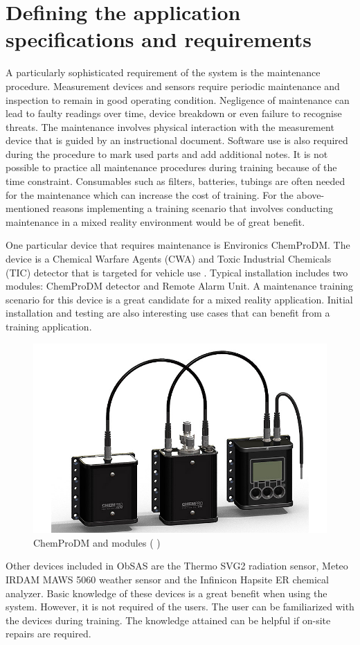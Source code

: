 \documentclass[12pt, a4paper,oneside, nocenter]{thesis}
\renewcommand{\citeyearpar}[1]{(\citeauthor{#1} \citeyear{#1})}
\begin{document}
\section{Defining the application specifications and requirements}
A particularly sophisticated requirement of the system is the maintenance procedure. Measurement devices and sensors require periodic maintenance and inspection to remain in good operating condition. Negligence of maintenance can lead to faulty readings over time, device breakdown or even failure to recognise threats. The maintenance involves physical interaction with the measurement device that is guided by an instructional document. Software use is also required during the procedure to mark used parts and add additional notes. It is not possible to practice all maintenance procedures during training because of the time constraint. Consumables such as filters, batteries, tubings are often needed for the maintenance which can increase the cost of training. For the above-mentioned reasons implementing a training scenario that involves conducting maintenance in a mixed reality environment would be of great benefit.
\par
One particular device that requires maintenance is Environics ChemProDM. The device is a Chemical Warfare Agents (CWA) and Toxic Industrial Chemicals (TIC) detector that is targeted for vehicle use . Typical installation includes two modules: ChemProDM detector and Remote Alarm Unit. A maintenance training scenario for this device is a great candidate for a mixed reality application. Initial installation and testing are also interesting use cases that can benefit from a training application.
\begin{figure}[H]
	\includegraphics[width=\textwidth]{chemprodm}
	\caption{ChemProDM and modules \citeyearpar{environics-chemprodm}}
	\label{fig:chemprodm}
\end{figure}
\par
Other devices included in ObSAS are the Thermo SVG2 radiation sensor, Meteo IRDAM MAWS 5060 weather sensor and the Infinicon Hapsite ER chemical analyzer. Basic knowledge of these devices is a great benefit when using the system. However, it is not required of the users. The user can be familiarized with the devices during training. The knowledge attained can be helpful if on-site repairs are required.
\par
\end{document}
